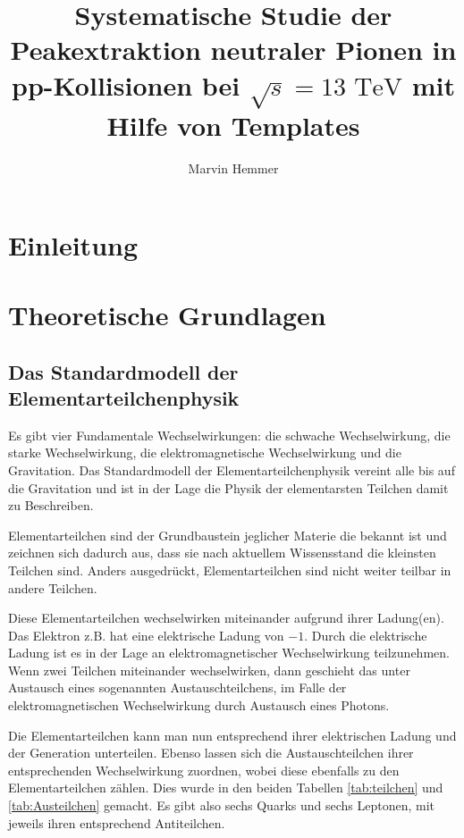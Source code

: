 \documentclass[11pt]{article}
\title{Systematische Studie der Peakextraktion neutraler Pionen in pp-Kollisionen bei $\sqrt{s}=13\text{ TeV}$ mit Hilfe von Templates}
\author{Marvin Hemmer}
\begin{document}
\maketitle
\newpage
\tableofcontents
\newpage

\section*{Einleitung}

\section{Theoretische Grundlagen}
\subsection{Das Standardmodell der Elementarteilchenphysik}

Es gibt vier Fundamentale Wechselwirkungen: die schwache Wechselwirkung, die starke Wechselwirkung, die elektromagnetische Wechselwirkung und die Gravitation. Das Standardmodell der Elementarteilchenphysik vereint alle bis auf die Gravitation und ist in der Lage die Physik der elementarsten Teilchen damit zu Beschreiben.

Elementarteilchen sind der Grundbaustein jeglicher Materie die bekannt ist und zeichnen sich dadurch aus, dass sie nach aktuellem Wissensstand die kleinsten Teilchen sind. Anders ausgedrückt, Elementarteilchen sind nicht weiter teilbar in andere Teilchen.

Diese Elementarteilchen wechselwirken miteinander aufgrund ihrer Ladung(en). Das Elektron z.B. hat eine elektrische Ladung von $-1$. Durch die elektrische Ladung ist es in der Lage an elektromagnetischer Wechselwirkung teilzunehmen. Wenn zwei Teilchen miteinander wechselwirken, dann geschieht das unter Austausch eines sogenannten Austauschteilchens, im Falle der elektromagnetischen Wechselwirkung durch Austausch eines Photons.

Die Elementarteilchen kann man nun entsprechend ihrer elektrischen Ladung und der Generation unterteilen. Ebenso lassen sich die Austauschteilchen ihrer entsprechenden Wechselwirkung zuordnen, wobei diese ebenfalls zu den Elementarteilchen z{\"a}hlen. Dies wurde in den beiden Tabellen \ref{tab:teilchen} und \ref{tab:Austeilchen} gemacht. Es gibt also sechs Quarks und sechs Leptonen, mit jeweils ihren entsprechend Antiteilchen.
\end{document}
